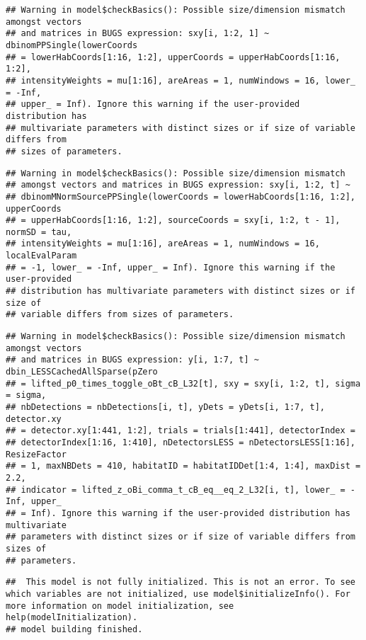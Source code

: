 \documentclass[
]{article}
\begin{document}
\begin{verbatim}
## Warning in model$checkBasics(): Possible size/dimension mismatch amongst vectors
## and matrices in BUGS expression: sxy[i, 1:2, 1] ~ dbinomPPSingle(lowerCoords
## = lowerHabCoords[1:16, 1:2], upperCoords = upperHabCoords[1:16, 1:2],
## intensityWeights = mu[1:16], areAreas = 1, numWindows = 16, lower_ = -Inf,
## upper_ = Inf). Ignore this warning if the user-provided distribution has
## multivariate parameters with distinct sizes or if size of variable differs from
## sizes of parameters.
\end{verbatim}

\begin{verbatim}
## Warning in model$checkBasics(): Possible size/dimension mismatch
## amongst vectors and matrices in BUGS expression: sxy[i, 1:2, t] ~
## dbinomMNormSourcePPSingle(lowerCoords = lowerHabCoords[1:16, 1:2], upperCoords
## = upperHabCoords[1:16, 1:2], sourceCoords = sxy[i, 1:2, t - 1], normSD = tau,
## intensityWeights = mu[1:16], areAreas = 1, numWindows = 16, localEvalParam
## = -1, lower_ = -Inf, upper_ = Inf). Ignore this warning if the user-provided
## distribution has multivariate parameters with distinct sizes or if size of
## variable differs from sizes of parameters.
\end{verbatim}

\begin{verbatim}
## Warning in model$checkBasics(): Possible size/dimension mismatch amongst vectors
## and matrices in BUGS expression: y[i, 1:7, t] ~ dbin_LESSCachedAllSparse(pZero
## = lifted_p0_times_toggle_oBt_cB_L32[t], sxy = sxy[i, 1:2, t], sigma = sigma,
## nbDetections = nbDetections[i, t], yDets = yDets[i, 1:7, t], detector.xy
## = detector.xy[1:441, 1:2], trials = trials[1:441], detectorIndex =
## detectorIndex[1:16, 1:410], nDetectorsLESS = nDetectorsLESS[1:16], ResizeFactor
## = 1, maxNBDets = 410, habitatID = habitatIDDet[1:4, 1:4], maxDist = 2.2,
## indicator = lifted_z_oBi_comma_t_cB_eq__eq_2_L32[i, t], lower_ = -Inf, upper_
## = Inf). Ignore this warning if the user-provided distribution has multivariate
## parameters with distinct sizes or if size of variable differs from sizes of
## parameters.
\end{verbatim}

\begin{verbatim}
##  This model is not fully initialized. This is not an error. To see which variables are not initialized, use model$initializeInfo(). For more information on model initialization, see help(modelInitialization).
## model building finished.
\end{verbatim}
\end{document}
